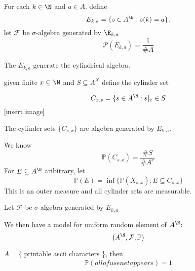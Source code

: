 For each  $k \in \N$ and $a \in A$, define
\[
	E_{k,a} = \{ s \in A^{\N} : s(k) = a \},
\] 
let $\mathcal{F}$ be $\sigma$-algebra generated by $\E_{k,a}$ 
\[
	\mathcal{P}(E_{k,a}) = \frac{1}{\#A}
\] 

The $E_{k,a}$ generate the cylindrical algebra.


given finite $x \subseteq \N$ and $S \subseteq A^X$ define the cylinder set

\[
	C_{x,s} = \{ s \in A^{\N} : s |_{x} \in S
\] 
[insert image]

The cylinder sets $\{ C_{s,x} \}$ are algebra generated by $E_{k,a}$.

We know 
\[
	\mathbb{P}(C_{s,x} ) = \frac{\#S}{\# A^x}
\] 
For $E \subseteq A^{\N}$ aribitrary, let
 \[
	 \mathbb{P}(E) = \inf \{\mathbb{P}(X_{s,x}) : E \subseteq C_{s,x} \}
\] 
This is an outer measure and all cylinder sets are measurable.

Let $\mathcal{F}$ be $\sigma$-algebra generated by $E_{k,a}$
 
We then have a model for uniform random element of $A^{\N}$:
\[
	(A^{\N}, \mathcal{F}, \mathbb{P})
\] 

\begin{example}

	$A = $\{ printable ascii characters \}, then
	\begin{align*}
		\mathbb{P}(all of usenet appears ) = 1
	\end{align*} 
\end{example}

